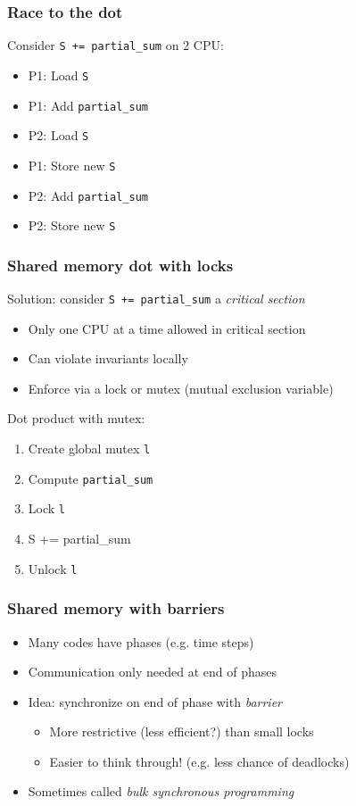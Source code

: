 \documentclass{beamer}
\begin{document}
\begin{frame}[fragile]
  \frametitle{Race to the dot}

  Consider {\tt S += partial\_sum} on 2 CPU:
  \begin{itemize}
  \item P1: Load {\tt S}
  \item P1: Add {\tt partial\_sum}
  \item P2: Load {\tt S}
  \item P1: Store new {\tt S}
  \item P2: Add {\tt partial\_sum}
  \item P2: Store new {\tt S}
  \end{itemize}
\end{frame}

\begin{frame}
  \frametitle{Shared memory dot with locks}

  Solution: consider {\tt S += partial\_sum} a {\em critical section}
  \begin{itemize}
  \item Only one CPU at a time allowed in critical section
  \item Can violate invariants locally
  \item Enforce via a lock or mutex (mutual exclusion variable)
  \end{itemize}
  
  \vspace{5mm}
  Dot product with mutex:
  \begin{enumerate}
  \item Create global mutex {\tt l}
  \item Compute {\tt partial\_sum}
  \item Lock {\tt l}
  \item {S += partial\_sum}
  \item Unlock {\tt l}
  \end{enumerate}

\end{frame}


\begin{frame}
  \frametitle{Shared memory with barriers}
  
  \begin{itemize}
  \item Many codes have phases (e.g. time steps)
  \item Communication only needed at end of phases
  \item Idea: synchronize on end of phase with {\em barrier}
    \begin{itemize}
    \item More restrictive (less efficient?) than small locks
    \item Easier to think through!  (e.g. less chance of deadlocks)
    \end{itemize}
  \item Sometimes called {\em bulk synchronous programming}
  \end{itemize}

\end{frame}
\end{document}
